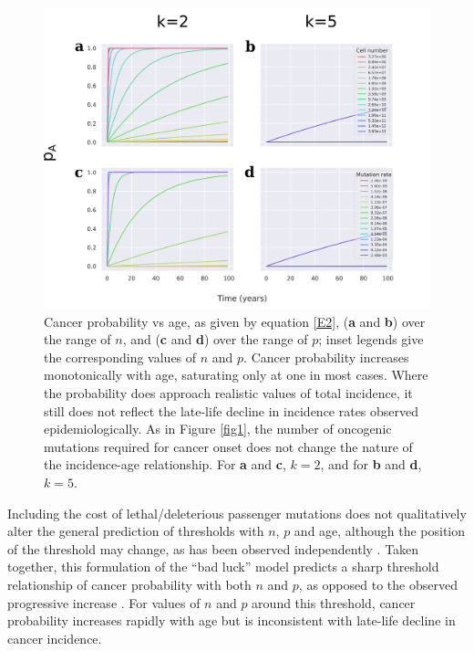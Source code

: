 \documentclass[12pt,onecolumn,twoside]{article}
\begin{document}
\begin{figure}[!ht]
	\begin{minipage}[c]{0.6\textwidth}
		\includegraphics[width=\linewidth, keepaspectratio=true]{fig2.png}
	\end{minipage}
	\begin{minipage}[c]{0.4\textwidth}
		\caption{Cancer probability vs age, as given by equation \ref{E2}, (\textbf{a} and \textbf{b}) over the range of $n$, and (\textbf{c} and \textbf{d}) over the range of $p$; inset legends give the corresponding values of $n$ and $p$. Cancer probability increases monotonically with age, saturating only at one in most cases. Where the probability does approach realistic values of total incidence, it still does not reflect the late-life decline in incidence rates observed epidemiologically. As in Figure \ref{fig1}, the number of oncogenic mutations required for cancer onset does not change the nature of the incidence-age relationship. For \textbf{a} and \textbf{c}, $k=2$, and for \textbf{b} and \textbf{d}, $k=5$.}
		\label{fig2}
	\end{minipage} 
\end{figure}

Including the cost of lethal/deleterious passenger mutations does not qualitatively alter the general prediction of thresholds with $n$, $p$ and age, although the position of the threshold may change, as has been observed independently \autocite{McFarland2013}. Taken together, this formulation of the ``bad luck'' model predicts a sharp threshold relationship of cancer probability with both $n$ and $p$, as opposed to the observed progressive increase \autocite{Tomasetti78, Tomasetti2017}. For values of $n$ and $p$ around this threshold, cancer probability increases rapidly with age but is inconsistent with late-life decline in cancer incidence.
\end{document}
